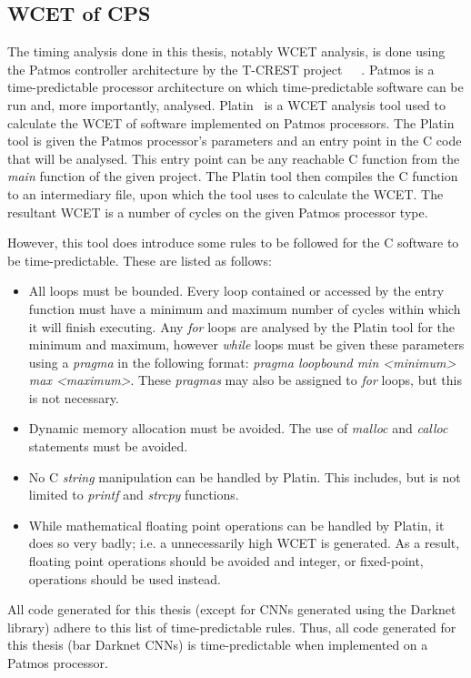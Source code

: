 \subsection{\acf{WCET} of \acf{CPS}}
The timing analysis done in this thesis, notably \acf{WCET} analysis, is done using the Patmos controller architecture by the T-CREST project~\cite{TCREST}~\cite{patmos:ppes2011}~\cite{patmos}.
Patmos is a time-predictable processor architecture on which time-predictable software can be run and, more importantly, analysed.
Platin~\cite{compiler:platin:kps15} is a \acf{WCET} analysis tool used to calculate the \ac{WCET} of software implemented on Patmos processors.
The Platin tool is given the Patmos processor's parameters and an entry point in the C code that will be analysed.
This entry point can be any reachable C function from the \textit{main} function of the given project.
The Platin tool then compiles the C function to an intermediary file, upon which the tool uses to calculate the \ac{WCET}.
The resultant \ac{WCET} is a number of cycles on the given Patmos processor type.

However, this tool does introduce some rules to be followed for the C software to be time-predictable.
These are listed as follows:
\begin{itemize}
	\item All loops must be bounded. Every loop contained or accessed by the entry function must have a minimum and maximum number of cycles within which it will finish executing. Any \textit{for} loops are analysed by the Platin tool for the minimum and maximum, however \textit{while} loops must be given these parameters using a \textit{pragma} in the following format: \textit{pragma loopbound min <minimum> max <maximum>}. These \textit{pragmas} may also be assigned to \textit{for} loops, but this is not necessary.
	\item Dynamic memory allocation must be avoided. The use of \textit{malloc} and \textit{calloc} statements must be avoided.
	\item No C \textit{string} manipulation can be handled by Platin. This includes, but is not limited to \textit{printf} and \textit{strcpy} functions.
	\item While mathematical floating point operations can be handled by Platin, it does so very badly; i.e. a unnecessarily high \ac{WCET} is generated. As a result, floating point operations should be avoided and integer, or fixed-point, operations should be used instead.
\end{itemize}
All code generated for this thesis (except for \acp{CNN} generated using the Darknet library) adhere to this list of time-predictable rules.
Thus, all code generated for this thesis (bar Darknet \acp{CNN}) is time-predictable when implemented on a Patmos processor.

